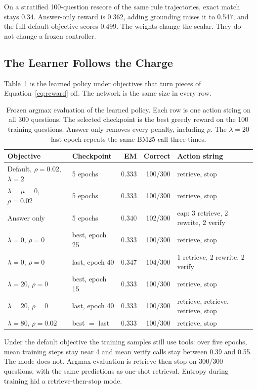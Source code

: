 \documentclass[letterpaper]{article} %
\begin{document}
On a stratified 100-question rescore of the same rule trajectories, exact match stays 0.34. Answer-only reward is 0.362, adding grounding raises it to 0.547, and the full default objective scores 0.499. The weights change the scalar. They do not change a frozen controller.

\subsection{The Learner Follows the Charge}
Table~\ref{tab:learned} is the learned policy under objectives that turn pieces of Equation~\ref{eq:reward} off. The network is the same size in every row.

\begin{table}[t]
\centering
\setlength{\tabcolsep}{3.5pt}
\begin{tabular}{llrrl}
\toprule
Objective & Checkpoint & EM & Correct & Action string \\
\midrule
Default, \(\rho{=}0.02\), \(\lambda{=}2\) & 5 epochs & 0.333 & 100/300 & retrieve, stop \\
\(\lambda{=}\mu{=}0\), \(\rho{=}0.02\) & 5 epochs & 0.333 & 100/300 & retrieve, stop \\
Answer only & 5 epochs & 0.340 & 102/300 & cap: 3 retrieve, 2 rewrite, 2 verify \\
\(\lambda{=}0\), \(\rho{=}0\) & best, epoch 25 & 0.333 & 100/300 & retrieve, stop \\
\(\lambda{=}0\), \(\rho{=}0\) & last, epoch 40 & 0.347 & 104/300 & 1 retrieve, 2 rewrite, 2 verify \\
\(\lambda{=}20\), \(\rho{=}0\) & best, epoch 15 & 0.333 & 100/300 & retrieve, stop \\
\(\lambda{=}20\), \(\rho{=}0\) & last, epoch 40 & 0.333 & 100/300 & retrieve, retrieve, retrieve, stop \\
\(\lambda{=}80\), \(\rho{=}0.02\) & best \(=\) last & 0.333 & 100/300 & retrieve, stop \\
\bottomrule
\end{tabular}
\caption{Frozen argmax evaluation of the learned policy. Each row is one action string on all 300 questions. The selected checkpoint is the best greedy reward on the 100 training questions. Answer only removes every penalty, including \(\rho\). The \(\lambda{=}20\) last epoch repeats the same BM25 call three times.}
\label{tab:learned}
\end{table}

Under the default objective the training samples still use tools: over five epochs, mean training steps stay near 4 and mean verify calls stay between 0.39 and 0.55. The mode does not. Argmax evaluation is retrieve-then-stop on 300/300 questions, with the same predictions as one-shot retrieval. Entropy during training hid a retrieve-then-stop mode.
\end{document}

